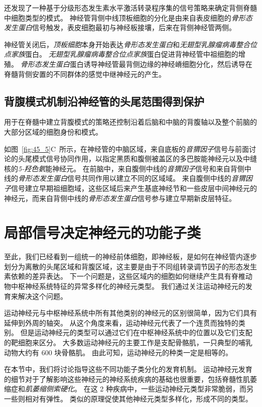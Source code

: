 还发现了一种基于分级形态发生素水平激活转录程序集的信号策略来确定背侧脊髓中细胞类型的模式。
神经管背侧中线顶板细胞的分化是由来自表皮细胞的\textit{骨形态发生蛋白}信号触发，表皮细胞最初与神经板接壤，后来在背侧神经管两侧。


神经管关闭后，\textit{顶板细胞}本身开始表达\textit{骨形态发生蛋白}和\textit{无翅型乳腺瘤病毒整合位点家族}蛋白。
\textit{无翅型乳腺瘤病毒整合位点家族}蛋白促进背神经管中祖细胞的增殖。
\textit{骨形态发生蛋白}蛋白诱导神经管最背侧边缘的神经嵴细胞分化，然后诱导在脊髓背侧安置的不同群体的感觉中继神经元的产生。



\subsection{背腹模式机制沿神经管的头尾范围得到保护}

用于在脊髓中建立背腹模式的策略还控制沿着后脑和中脑的背腹轴以及整个前脑的大部分区域的细胞身份和模式。


如图~\ref{fig:45_5}C~所示，在神经管的中脑区域，来自底板的\textit{音猬因子}信号与前面讨论的头尾模式信号协同作用，以指定黑质和腹侧被盖区的多巴胺能神经元以及中缝核的\textit{5-羟色氨}能神经元。
在前脑中，来自腹侧中线的\textit{音猬因子}信号和来自背侧中线的\textit{骨形态发生蛋白}信号共同作用以建立不同的区域域。
来自腹侧中线的\textit{音猬因子}信号建立早期祖细胞域，这些区域后来产生基底神经节和一些皮层中间神经元的神经元，而来自背侧中线的\textit{骨形态发生蛋白}信号参与建立早期新皮层特征。



\section{局部信号决定神经元的功能子类}

至此，我们已经看到一组统一的神经前体细胞，即神经板，是如何在神经管内逐步划分为离散的头尾区域和背腹区域，这主要是由于不同组转录调节因子的形态发生素依赖的差异表达。
下一个问题是，这些区域内的细胞如何继续产生具有脊椎动物中枢神经系统特征的异常多样化的神经元类型。
我们通过关注运动神经元的发育来解决这个问题。


运动神经元与中枢神经系统中所有其他类别的神经元的区别很简单，因为它们具有延伸到外周的轴突。
从这个角度来看，运动神经元代表了一个连贯而独特的类别。
但是运动神经元的类型可以通过它们在中枢神经系统中的位置以及它们支配的靶细胞来区分。
大多数运动神经元的主要工作是支配骨骼肌，一只典型的哺乳动物大约有 600 块骨骼肌。
由此可知，运动神经元的种类一定是相等的。


在本节中，我们将讨论指导这些不同功能子类分化的发育机制。
运动神经元发育的细节对于了解影响这些神经元的神经系统疾病的基础也很重要，包括脊髓性肌萎缩症和\textit{肌萎缩侧索硬化}。
在这 2 种疾病中，一些运动神经元类型非常脆弱，而另一些则相对有弹性。
类似的原理促使其他神经元类型多样化，形成不同的类型。



